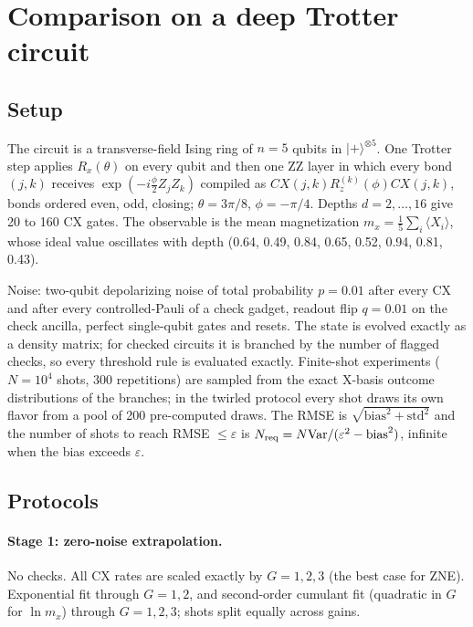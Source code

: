 \documentclass[11pt,a4paper]{article}
\theoremstyle{remark}
\newcommand{\Var}{\mathrm{Var}}
\begin{document}
\section{Comparison on a deep Trotter circuit}
\label{sec:demo}

\subsection{Setup}

The circuit is a transverse-field Ising ring of $n=5$ qubits in $|+\rangle^{\otimes5}$. One Trotter step applies $R_x(\theta)$ on every qubit and then one ZZ layer in which every bond $(j,k)$ receives $\exp(-i\tfrac\phi2Z_jZ_k)$ compiled as $CX(j,k)R_z^{(k)}(\phi)CX(j,k)$, bonds ordered even, odd, closing; $\theta=3\pi/8$, $\phi=-\pi/4$. Depths $d=2,\dots,16$ give 20 to 160 CX gates. The observable is the mean magnetization $m_x=\tfrac15\sum_i\langle X_i\rangle$, whose ideal value oscillates with depth (0.64, 0.49, 0.84, 0.65, 0.52, 0.94, 0.81, 0.43).

Noise: two-qubit depolarizing noise of total probability $p=0.01$ after every CX and after every controlled-Pauli of a check gadget, readout flip $q=0.01$ on the check ancilla, perfect single-qubit gates and resets. The state is evolved exactly as a density matrix; for checked circuits it is branched by the number of flagged checks, so every threshold rule is evaluated exactly. Finite-shot experiments ($N=10^4$ shots, 300 repetitions) are sampled from the exact X-basis outcome distributions of the branches; in the twirled protocol every shot draws its own flavor from a pool of 200 pre-computed draws. The RMSE is $\sqrt{\text{bias}^2+\text{std}^2}$ and the number of shots to reach RMSE $\le\varepsilon$ is $N_{\rm req}=N\Var/(\varepsilon^2-\text{bias}^2)$, infinite when the bias exceeds $\varepsilon$.

\subsection{Protocols}

\paragraph{Stage 1: zero-noise extrapolation.} No checks. All CX rates are scaled exactly by $G=1,2,3$ (the best case for ZNE). Exponential fit through $G=1,2$, and second-order cumulant fit (quadratic in $G$ for $\ln m_x$) through $G=1,2,3$; shots split equally across gains.
\end{document}
